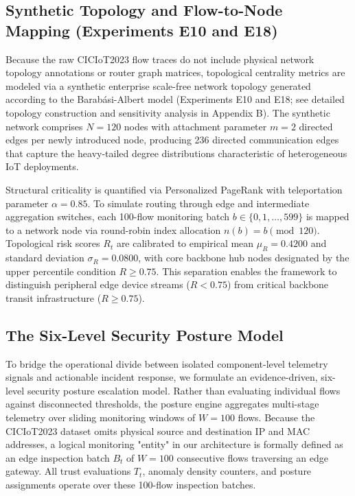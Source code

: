 \documentclass[journal,10pt,onecolumn]{IEEEtran}
\begin{document}
\subsection{Synthetic Topology and Flow-to-Node Mapping (Experiments E10 and E18)}
Because the raw CICIoT2023 flow traces do not include physical network topology annotations or router graph matrices, topological centrality metrics are modeled via a synthetic enterprise scale-free network topology generated according to the Barab\'asi-Albert model (Experiments E10 and E18; see detailed topology construction and sensitivity analysis in Appendix B). The synthetic network comprises $N = 120$ nodes with attachment parameter $m = 2$ directed edges per newly introduced node, producing 236 directed communication edges that capture the heavy-tailed degree distributions characteristic of heterogeneous IoT deployments.

Structural criticality is quantified via Personalized PageRank with teleportation parameter $\alpha = 0.85$. To simulate routing through edge and intermediate aggregation switches, each 100-flow monitoring batch $b \in \{0, 1, \dots, 599\}$ is mapped to a network node via round-robin index allocation $n(b) = b \pmod{120}$. Topological risk scores $R_t$ are calibrated to empirical mean $\mu_R = 0.4200$ and standard deviation $\sigma_R = 0.0800$, with core backbone hub nodes designated by the upper percentile condition $R \ge 0.75$. This separation enables the framework to distinguish peripheral edge device streams ($R < 0.75$) from critical backbone transit infrastructure ($R \ge 0.75$).


\subsection{The Six-Level Security Posture Model}
To bridge the operational divide between isolated component-level telemetry signals and actionable incident response, we formulate an evidence-driven, six-level security posture escalation model. Rather than evaluating individual flows against disconnected thresholds, the posture engine aggregates multi-stage telemetry over sliding monitoring windows of $W = 100$ flows. Because the CICIoT2023 dataset omits physical source and destination IP and MAC addresses, a logical monitoring "entity" in our architecture is formally defined as an edge inspection batch $B_t$ of $W = 100$ consecutive flows traversing an edge gateway. All trust evaluations $T_t$, anomaly density counters, and posture assignments operate over these 100-flow inspection batches.
\end{document}
